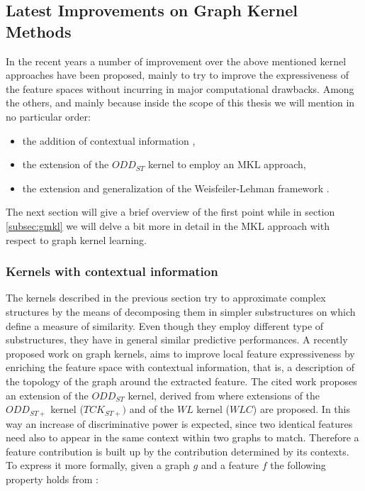 \subsection{Latest Improvements on Graph Kernel Methods}
\label{subsec:kernel}
In the recent years a number of improvement over the above mentioned kernel approaches
have been proposed, mainly to try to improve the expressiveness of the feature
spaces without incurring in major computational drawbacks.
Among the others, and mainly because inside the scope of this thesis we will
mention in no particular order:
\begin{itemize}
    \item the addition of contextual information \cite{Navarin2015},
    \item the extension of the $ODD_{ST}$ kernel to employ an MKL approach,
    \item the extension and generalization of the Weisfeiler-Lehman framework \cite{SanMartino2014}.
\end{itemize}

The next section will give a brief overview of the first point while in section
\ref{subsec:gmkl} we will delve a bit more in detail in the MKL approach
with respect to graph kernel learning.

\subsubsection{Kernels with contextual information}
\label{subsec:context}

The kernels described in the previous section try to approximate complex
structures by the means of decomposing them in simpler substructures on which
define a measure of similarity.
Even though they employ different type of substructures, they have in general
similar predictive performances.
A recently proposed work \cite{Navarin2015} on graph kernels, aims to improve local
feature expressiveness by enriching the feature space with contextual information,
that is, a description of the topology of the graph around the extracted feature.
The cited work proposes an extension of the $ODD_{ST}$ kernel, derived from
\cite{rtesselli} where extensions of the $ODD_{ST+}$ kernel ($TCK_{ST+})$ and of the $WL$
kernel ($WLC$) are proposed.
In this way an increase of discriminative power is expected, since two identical
features need also to appear in the same context within two graphs to match.
Therefore a feature contribution is built up by the contribution determined by
its contexts. To express it more formally, given a graph $g$ and a feature $f$
the following property holds from \cite{Navarin2015}:

